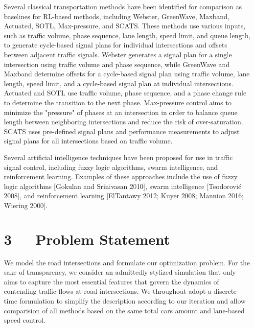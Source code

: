 \documentclass[letterpaper]{article} %
\begin{document}
Several classical transportation methods have been identified for comparison as baselines for RL-based methods, including Webster, GreenWave, Maxband, Actuated, SOTL, Max-pressure, and SCATS. These methods use various inputs, such as traffic volume, phase sequence, lane length, speed limit, and queue length, to generate cycle-based signal plans for individual intersections and offsets between adjacent traffic signals. Webster generates a signal plan for a single intersection using traffic volume and phase sequence, while GreenWave and Maxband determine offsets for a cycle-based signal plan using traffic volume, lane length, speed limit, and a cycle-based signal plan at individual intersections. Actuated and SOTL use traffic volume, phase sequence, and a phase change rule to determine the transition to the next phase. Max-pressure control aims to minimize the "pressure" of phases at an intersection in order to balance queue length between neighboring intersections and reduce the risk of over-saturation. SCATS uses pre-defined signal plans and performance measurements to adjust signal plans for all intersections based on traffic volume.

Several artificial intelligence techniques have been proposed for use in traffic signal control, including fuzzy logic algorithms, swarm intelligence, and reinforcement learning. Examples of these approaches include the use of fuzzy logic algorithms [Gokulan and Srinivasan 2010], swarm intelligence [Teodorović 2008], and reinforcement learning [ElTantawy 2012; Kuyer 2008; Mannion 2016; Wiering 2000].

\section{3\ \ \ Problem Statement}
\hspace*{1em}We model the road intersections and formulate our optimization problem. For the sake of transparency, we consider an admittedly stylized simulation that only aims to capture the most essential features that govern the dynamics of contending traffic flows at road intersections. We throughout adopt a discrete time formulation to simplify the description according to our iteration and allow comparision of all methods based on the same total cars amount and lane-based speed control.
\end{document}
